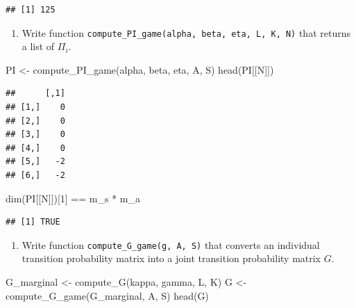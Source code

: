 \documentclass[
]{book}
\newenvironment{Shaded}{\begin{snugshade}}{\end{snugshade}}
\newcommand{\DecValTok}[1]{\textcolor[rgb]{0.00,0.00,0.81}{#1}}
\newcommand{\FunctionTok}[1]{\textcolor[rgb]{0.00,0.00,0.00}{#1}}
\newcommand{\NormalTok}[1]{#1}
\newcommand{\OtherTok}[1]{\textcolor[rgb]{0.56,0.35,0.01}{#1}}
\newcommand{\SpecialCharTok}[1]{\textcolor[rgb]{0.00,0.00,0.00}{#1}}
\providecommand{\tightlist}{%
  \setlength{\itemsep}{0pt}\setlength{\parskip}{0pt}}
\begin{document}
\begin{Shaded}
\end{Shaded}

\begin{verbatim}
## [1] 125
\end{verbatim}

\begin{enumerate}
\def\labelenumi{\arabic{enumi}.}
\setcounter{enumi}{2}
\tightlist
\item
  Write function \texttt{compute\_PI\_game(alpha,\ beta,\ eta,\ L,\ K,\ N)} that returns a list of \(\Pi_i\).
\end{enumerate}

\begin{Shaded}
\begin{Highlighting}[]
\NormalTok{PI }\OtherTok{\textless{}{-}} \FunctionTok{compute\_PI\_game}\NormalTok{(alpha, beta, eta, A, S)}
\FunctionTok{head}\NormalTok{(PI[[N]])}
\end{Highlighting}
\end{Shaded}

\begin{verbatim}
##      [,1]
## [1,]    0
## [2,]    0
## [3,]    0
## [4,]    0
## [5,]   -2
## [6,]   -2
\end{verbatim}

\begin{Shaded}
\begin{Highlighting}[]
\FunctionTok{dim}\NormalTok{(PI[[N]])[}\DecValTok{1}\NormalTok{] }\SpecialCharTok{==}\NormalTok{ m\_s }\SpecialCharTok{*}\NormalTok{ m\_a}
\end{Highlighting}
\end{Shaded}

\begin{verbatim}
## [1] TRUE
\end{verbatim}

\begin{enumerate}
\def\labelenumi{\arabic{enumi}.}
\setcounter{enumi}{3}
\tightlist
\item
  Write function \texttt{compute\_G\_game(g,\ A,\ S)} that converts an individual transition probability matrix into a joint transition probability matrix \(G\).
\end{enumerate}

\begin{Shaded}
\begin{Highlighting}[]
\NormalTok{G\_marginal }\OtherTok{\textless{}{-}} \FunctionTok{compute\_G}\NormalTok{(kappa, gamma, L, K)}
\NormalTok{G }\OtherTok{\textless{}{-}} \FunctionTok{compute\_G\_game}\NormalTok{(G\_marginal, A, S)}
\FunctionTok{head}\NormalTok{(G)}
\end{Highlighting}
\end{Shaded}
\end{document}
